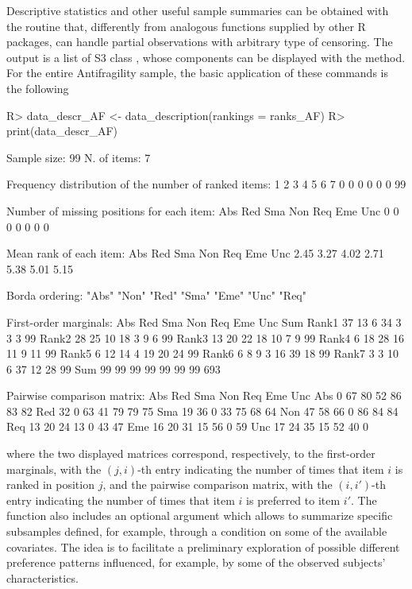 Descriptive statistics and other useful sample summaries can be obtained with the  routine that, differently from analogous functions supplied by other \textsf{R} packages, can handle partial observations with arbitrary type of censoring. The output is a list of S3 class , whose components can be displayed with the  method.
For the entire Antifragility sample, the basic application of these commands is the following
\begin{example}
R> data_descr_AF <- data_description(rankings = ranks_AF)
R> print(data_descr_AF)

Sample size: 99 
N. of items: 7 

Frequency distribution of the number of ranked items:
 1  2  3  4  5  6  7 
 0  0  0  0  0  0 99 

Number of missing positions for each item:
Abs Red Sma Non Req Eme Unc 
  0   0   0   0   0   0   0 

Mean rank of each item:
 Abs  Red  Sma  Non  Req  Eme  Unc 
2.45 3.27 4.02 2.71 5.38 5.01 5.15 

Borda ordering:
"Abs" "Non" "Red" "Sma" "Eme" "Unc" "Req"

First-order marginals:
      Abs Red Sma Non Req Eme Unc Sum
Rank1  37  13   6  34   3   3   3  99
Rank2  28  25  10  18   3   9   6  99
Rank3  13  20  22  18  10   7   9  99
Rank4   6  18  28  16  11   9  11  99
Rank5   6  12  14   4  19  20  24  99
Rank6   6   8   9   3  16  39  18  99
Rank7   3   3  10   6  37  12  28  99
Sum    99  99  99  99  99  99  99 693

Pairwise comparison matrix:
    Abs Red Sma Non Req Eme Unc
Abs   0  67  80  52  86  83  82
Red  32   0  63  41  79  79  75
Sma  19  36   0  33  75  68  64
Non  47  58  66   0  86  84  84
Req  13  20  24  13   0  43  47
Eme  16  20  31  15  56   0  59
Unc  17  24  35  15  52  40   0
\end{example}
where the two displayed matrices correspond, respectively, to
the first-order marginals, with the $(j,i)$-th entry indicating the number of times that item $i$ is ranked in position $j$, and
the pairwise comparison matrix, with the $(i,i')$-th entry indicating the number of times that item $i$ is preferred to item $i'$.
The function  also includes an optional  argument which allows to summarize specific subsamples defined, for example, through a condition on some of the available covariates. The idea is to facilitate a preliminary exploration of possible different preference patterns influenced, for example, by some of the observed subjects' characteristics.

